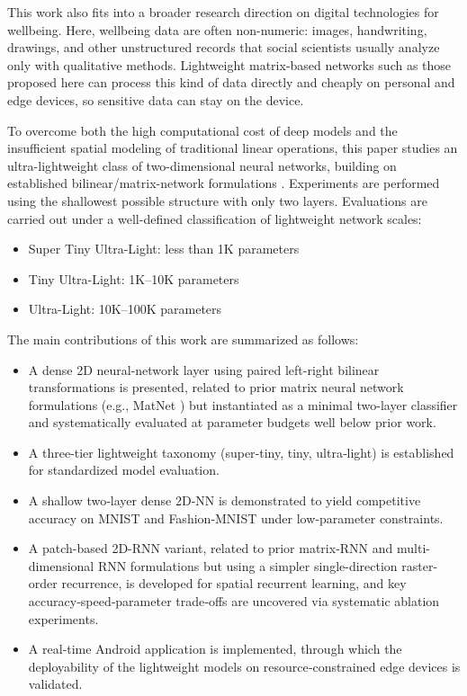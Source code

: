 \documentclass[pdflatex,sn-mathphys-num]{sn-jnl}%
\theoremstyle{thmstyleone}%
\theoremstyle{thmstyletwo}%
\theoremstyle{thmstylethree}%
\begin{document}
This work also fits into a broader research direction on digital technologies for wellbeing. Here, wellbeing data are often non-numeric: images, handwriting, drawings, and other unstructured records that social scientists usually analyze only with qualitative methods. Lightweight matrix-based networks such as those proposed here can process this kind of data directly and cheaply on personal and edge devices, so sensitive data can stay on the device.

To overcome both the high computational cost of deep models and the insufficient spatial modeling of traditional linear operations, this paper studies an ultra-lightweight class of two-dimensional neural networks, building on established bilinear/matrix-network formulations \cite{Gao2017MatNet, Renanse2023}. Experiments are performed using the shallowest possible structure with only two layers. Evaluations are carried out under a well-defined classification of lightweight network scales:
\begin{itemize}
    \item Super Tiny Ultra-Light: less than 1K parameters
    \item Tiny Ultra-Light: 1K--10K parameters
    \item Ultra-Light: 10K--100K parameters
\end{itemize}

The main contributions of this work are summarized as follows:

\begin{itemize}
    \item A dense 2D neural-network layer using paired left-right bilinear transformations is presented, related to prior matrix neural network formulations (e.g., MatNet \cite{Gao2017MatNet}) but instantiated as a minimal two-layer classifier and systematically evaluated at parameter budgets well below prior work.
    \item A three‑tier lightweight taxonomy (super‑tiny, tiny, ultra‑light) is established for standardized model evaluation.
    \item  A shallow two‑layer dense 2D‑NN is demonstrated to yield competitive accuracy on MNIST and Fashion‑MNIST under low‑parameter constraints.
    \item A patch-based 2D-RNN variant, related to prior matrix-RNN and multi-dimensional RNN formulations \cite{Renanse2023, Graves2007MDRNN} but using a simpler single-direction raster-order recurrence, is developed for spatial recurrent learning, and key accuracy‑speed‑parameter trade‑offs are uncovered via systematic ablation experiments.
    \item A real‑time Android application is implemented, through which the deployability of the lightweight models on resource‑constrained edge devices is validated.
    
\end{itemize}
\end{document}
